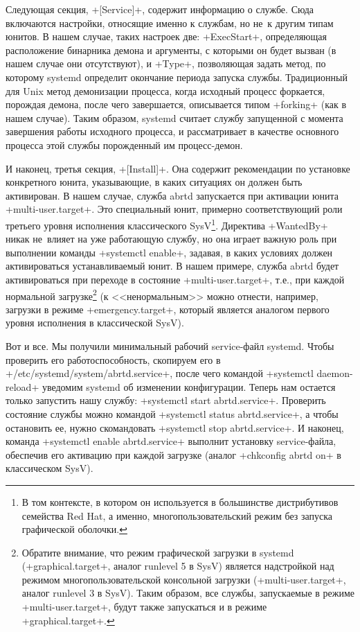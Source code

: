 \documentclass[10pt,oneside,a4paper]{article}
\begin{document}
Следующая секция, +[Service]+, содержит информацию о службе. Сюда включаются
настройки, относящие именно к службам, но не~к другим типам юнитов. В нашем
случае, таких настроек две: +ExecStart+, определяющая расположение бинарника
демона и аргументы, с которыми он будет вызван (в нашем случае они
отсутствуют), и +Type+, позволяющая задать метод, по которому systemd определит
окончание периода запуска службы. Традиционный для Unix метод демонизации
процесса, когда исходный процесс форкается, порождая демона, после чего
завершается, описывается типом +forking+ (как в нашем случае). Таким образом,
systemd считает службу запущенной с момента завершения работы исходного
процесса, и рассматривает в качестве основного процесса этой службы
порожденный им процесс-демон.

И наконец, третья секция, +[Install]+. Она содержит рекомендации по
установке конкретного юнита, указывающие, в каких ситуациях он должен быть
активирован.  В нашем случае, служба abrtd запускается при активации юнита
+multi-user.target+. Это специальный юнит, примерно соответствующий роли
третьего уровня исполнения классического SysV\footnote{В том контексте, в
котором он используется в большинстве дистрибутивов семейства Red Hat, а
именно, многопользовательский режим без запуска графической оболочки.}.
Директива +WantedBy+ никак не~влияет на уже работающую службу, но она
играет важную роль при выполнении команды +systemctl enable+, задавая, в каких
условиях должен активироваться устанавливаемый юнит. В нашем примере, служба
abrtd будет активироваться при переходе в состояние +multi-user.target+,
т.е., при каждой нормальной загрузке\footnote{Обратите внимание, что режим
графической загрузки в systemd (+graphical.target+, аналог runlevel 5
в SysV) является надстройкой над режимом многопользовательской консольной
загрузки (+multi-user.target+, аналог runlevel 3 в SysV). Таким
образом, все службы, запускаемые в режиме +multi-user.target+, будут
также запускаться и в режиме +graphical.target+.} (к <<ненормальным>>
можно отнести, например, загрузки в режиме +emergency.target+, который
является аналогом первого уровня исполнения в классической SysV).

Вот и все. Мы получили минимальный рабочий service-файл systemd. Чтобы
проверить его работоспособность, скопируем его в
+/etc/systemd/system/abrtd.service+, после чего командой
+systemctl daemon-reload+ уведомим systemd об изменении конфигурации.
Теперь нам остается только запустить нашу службу:
+systemctl start abrtd.service+.  Проверить состояние службы можно
командой +systemctl status abrtd.service+, а чтобы остановить ее, нужно
скомандовать +systemctl stop abrtd.service+. И наконец, команда
+systemctl enable abrtd.service+ выполнит установку service-файла,
обеспечив его активацию при каждой загрузке (аналог +chkconfig abrtd on+
в классическом SysV).
\end{document}

